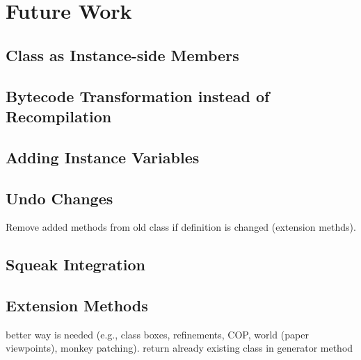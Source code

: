 \chapter{Future Work}

\section{Class as Instance-side Members}
\label{sec:future_inst_side}

\section{Bytecode Transformation instead of Recompilation}

\section{Adding Instance Variables}

\section{Undo Changes}
Remove added methods from old class if definition is changed (extension methds).

\section{Squeak Integration}

\section{Extension Methods}
\label{sec:future_ext_meth}
better way is needed (e.g., class boxes, refinements, COP, world (paper viewpoints), monkey patching). return already existing class in generator method